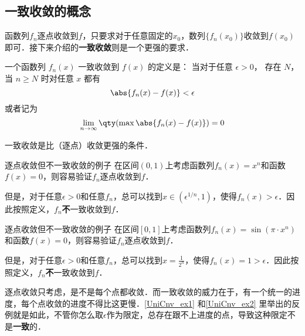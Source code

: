 
\begin{issues}
\issueDraft
\end{issues}


\subsection{一致收敛的概念}

函数列$f_n$逐点收敛到$f$，只要求对于任意固定的$x_0$，数列$\{f_n(x_0)\}$收敛到$f(x_0)$即可．接下来介绍的\textbf{一致收敛}则是一个更强的要求．

一个函数列 $f_n(x)$ 一致收敛到 $f(x)$ 的定义是： 当对于任意 $\epsilon > 0$， 存在 $N$， 当 $n \geqslant N$ 时对任意 $x$ 都有
\begin{equation}\label{UniCnv_eq1}
\abs{f_n(x) - f(x)} < \epsilon
\end{equation}
或者记为
\begin{equation}
\lim_{n\to\infty} \qty(\max \abs{f_n(x) - f(x)}) = 0
\end{equation}

一致收敛是比（逐点）收敛更强的条件．

\begin{example}{逐点收敛但不一致收敛的例子}\label{UniCnv_ex1}
在区间$(0, 1)$上考虑函数列$f_n(x)=x^n$和函数$f(x)=0$，则容易验证$f_n$逐点收敛到$f$．

但是，对于任意$\epsilon>0$和任意$f_n$，总可以找到$x\in(\epsilon^{1/n}, 1)$，使得$f_n(x)>\epsilon$．因此按照定义，$f_n$\textbf{不}一致收敛到$f$．

\end{example}

\begin{example}{逐点收敛但不一致收敛的例子}\label{UniCnv_ex2}
在区间$[0, 1]$上考虑函数列$f_n(x)=\sin(\pi\cdot x^n)$和函数$f(x)=0$，则容易验证$f_n$逐点收敛到$f$．

但是，对于任意$\epsilon>0$和任意$f_n$，总可以找到$x=\frac{1}{2^n}$，使得$f_n(x)=1>\epsilon$．因此按照定义，$f_n$\textbf{不}一致收敛到$f$．

\end{example}

逐点收敛只考虑，是不是每个点都收敛．而一致收敛的威力在于，有一个统一的进度，每个点收敛的进度不得比这更慢．\autoref{UniCnv_ex1} 和\autoref{UniCnv_ex2} 里举出的反例就是如此，不管你怎么取$\epsilon$作为限定，总存在跟不上进度的点，导致这种限定不是\textbf{一致}的．

